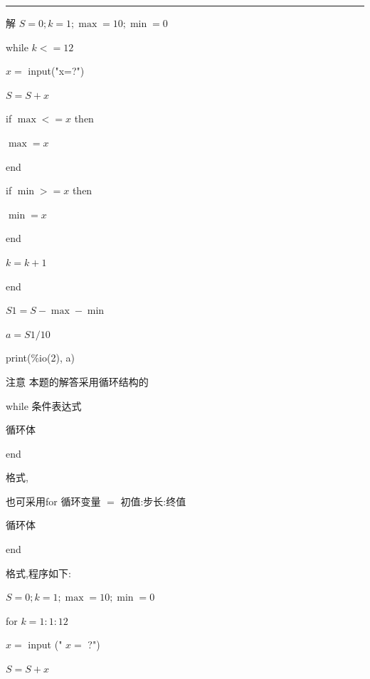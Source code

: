 \documentclass[10pt]{article}
\newcommand{\HRule}{\begin{center}\rule{0.9\linewidth}{0.2mm}\end{center}}
\begin{document}
\HRule

解 \(S = 0;k = 1;\max  = {10};\min  = 0\)

\hspace*{1em} while \(k <  = {12}\)

\hspace*{1em} \(x =\) input("x=?")

\hspace*{1em} \(S = S + x\)

\hspace*{1em} if \(\max  <  = x\) then

\hspace*{1em} \(\max  = x\)

\hspace*{1em} end

\hspace*{1em} if \(\min  >  = x\) then

\hspace*{1em} \(\min  = x\)

\hspace*{1em} end

\hspace*{1em} \(k = k + 1\)

\hspace*{1em} end

\hspace*{1em} \({S1} = S - \max  - \min\)

\hspace*{1em} \(a = {S1}/{10}\)

\hspace*{1em} print(\%io(2), a)

注意 本题的解答采用循环结构的

while 条件表达式

\hspace*{1em} 循环体

end

格式,

也可采用for 循环变量 \(=\) 初值:步长:终值

\hspace*{4em} 循环体

\hspace*{2em} end

格式,程序如下:

\(S = 0;k = 1;\max  = {10};\min  = 0\)

for \(k = 1 : 1 : {12}\)

\(x =\) input (" \(x =\) ?")

\(S = S + x\)
\end{document}
